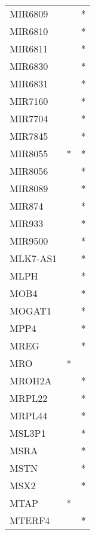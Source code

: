 \begin{longtable}{lcc}
MIR6809         &                &          * \\
MIR6810         &                &          * \\
MIR6811         &                &          * \\
MIR6830         &                &          * \\
MIR6831         &                &          * \\
MIR7160         &                &          * \\
MIR7704         &                &          * \\
MIR7845         &                &          * \\
MIR8055         &              * &          * \\
MIR8056         &                &          * \\
MIR8089         &                &          * \\
MIR874          &                &          * \\
MIR933          &                &          * \\
MIR9500         &                &          * \\
MLK7-AS1        &                &          * \\
MLPH            &                &          * \\
MOB4            &                &          * \\
MOGAT1          &                &          * \\
MPP4            &                &          * \\
MREG            &                &          * \\
MRO             &              * &            \\
MROH2A          &                &          * \\
MRPL22          &                &          * \\
MRPL44          &                &          * \\
MSL3P1          &                &          * \\
MSRA            &                &          * \\
MSTN            &                &          * \\
MSX2            &                &          * \\
MTAP            &              * &            \\
MTERF4          &                &          * \\

\end{longtable}

